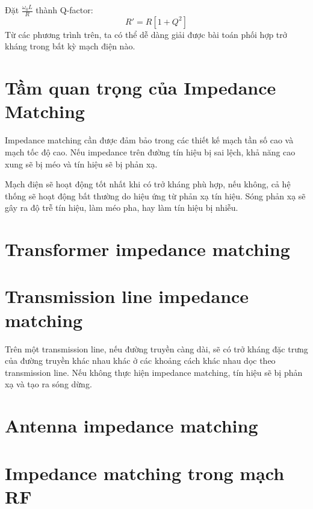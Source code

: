         Đặt $\frac{\omega_0 L}{R}$ thành Q-factor:
        \begin{equation}
            R' = R\left[1 + Q^2\right]
        \end{equation}
        Từ các phương trình trên, ta có thể dễ dàng giải được bài toán phối hợp trở kháng trong bất kỳ mạch điện nào.\cite{allaboutcircuits_impedance}

    \section{Tầm quan trọng của Impedance Matching}
        Impedance matching cần được đảm bảo trong các thiết kế mạch tần số cao
        và mạch tốc độ cao. Nếu impedance trên đường tín hiệu bị sai lệch,
        khả năng cao xung sẽ bị méo và tín hiệu sẽ bị phản xạ.\par
        Mạch điện sẽ hoạt động tốt nhất khi có trở kháng phù hợp, nếu không, cả hệ thống sẽ hoạt động bất thường do hiệu ứng từ phản xạ tín hiệu.
        Sóng phản xạ sẽ gây ra độ trễ tín hiệu, làm méo pha, hay làm tín hiệu bị nhiễu.
        
    \section{Transformer impedance matching}

    \section{Transmission line impedance matching}
        Trên một transmission line, nếu đường truyền càng dài,
        sẽ có trở kháng đặc trưng của đường truyền khác nhau khác
        ở các khoảng cách khác nhau dọc theo transmission line.
        Nếu không thực hiện impedance matching, tín hiệu sẽ bị phản xạ
        và tạo ra sóng dừng.

    \section{Antenna impedance matching}

    \section{Impedance matching trong mạch RF}
